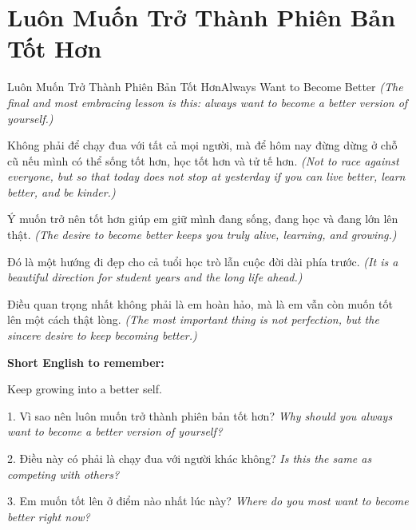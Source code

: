 \section{Luôn Muốn Trở Thành Phiên Bản Tốt Hơn}
\begin{truyen}{Luôn Muốn Trở Thành Phiên Bản Tốt Hơn}{Always Want to Become Better}
\textit{(The final and most embracing lesson is this: always want to become a better version of yourself.)}

Không phải để chạy đua với tất cả mọi người, mà để hôm nay đừng dừng ở chỗ cũ nếu mình có thể sống tốt hơn, học tốt hơn và tử tế hơn.
\textit{(Not to race against everyone, but so that today does not stop at yesterday if you can live better, learn better, and be kinder.)}

Ý muốn trở nên tốt hơn giúp em giữ mình đang sống, đang học và đang lớn lên thật.
\textit{(The desire to become better keeps you truly alive, learning, and growing.)}

Đó là một hướng đi đẹp cho cả tuổi học trò lẫn cuộc đời dài phía trước.
\textit{(It is a beautiful direction for student years and the long life ahead.)}
\end{truyen}

\begin{baihoc}
Điều quan trọng nhất không phải là em hoàn hảo, mà là em vẫn còn muốn tốt lên một cách thật lòng.
\textit{(The most important thing is not perfection, but the sincere desire to keep becoming better.)}
\end{baihoc}

\begin{ghinhoanh}
\textbf{Short English to remember:}

Keep growing into a better self.

\end{ghinhoanh}

\begin{tuhocnhanh}
1. Vì sao nên luôn muốn trở thành phiên bản tốt hơn? \textit{Why should you always want to become a better version of yourself?}

2. Điều này có phải là chạy đua với người khác không? \textit{Is this the same as competing with others?}

3. Em muốn tốt lên ở điểm nào nhất lúc này? \textit{Where do you most want to become better right now?}
\end{tuhocnhanh}
\ngancach

